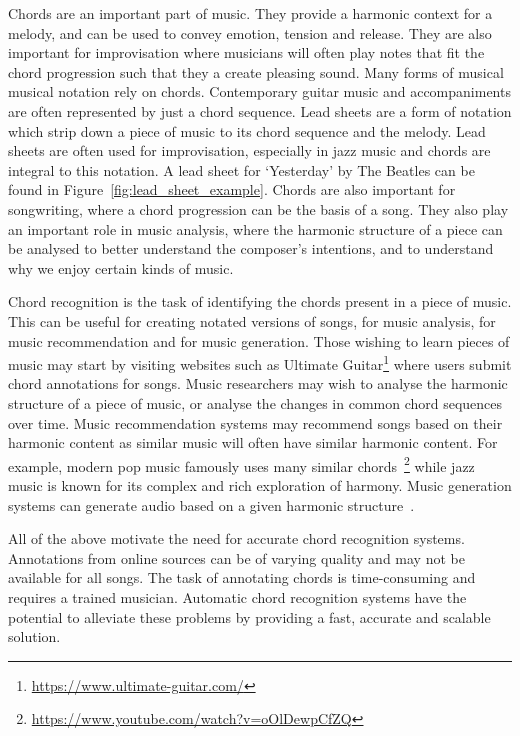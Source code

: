 Chords are an important part of music. They provide a harmonic context for a melody, and can be used to convey emotion, tension and release. They are also important for improvisation where musicians will often play notes that fit the chord progression such that they a create pleasing sound. Many forms of musical musical notation rely on chords. Contemporary guitar music and accompaniments are often represented by just a chord sequence. Lead sheets are a form of notation which strip down a piece of music to its chord sequence and the melody. Lead sheets are often used for improvisation, especially in jazz music and chords are integral to this notation. A lead sheet for `Yesterday' by The Beatles can be found in Figure~\ref{fig:lead_sheet_example}. Chords are also important for songwriting, where a chord progression can be the basis of a song. They also play an important role in music analysis, where the harmonic structure of a piece can be analysed to better understand the composer's intentions, and to understand why we enjoy certain kinds of music.

Chord recognition is the task of identifying the chords present in a piece of music. This can be useful for creating notated versions of songs, for music analysis, for music recommendation and for music generation. Those wishing to learn pieces of music may start by visiting websites such as Ultimate Guitar\footnote{\url{https://www.ultimate-guitar.com/}} where users submit chord annotations for songs. Music researchers may wish to analyse the harmonic structure of a piece of music, or analyse the changes in common chord sequences over time. Music recommendation systems may recommend songs based on their harmonic content as similar music will often have similar harmonic content. For example, modern pop music famously uses many similar chords~\footnote{\url{https://www.youtube.com/watch?v=oOlDewpCfZQ}} while jazz music is known for its complex and rich exploration of harmony. Music generation systems can generate audio based on a given harmonic structure~\citep{MusicGenChord}.

All of the above motivate the need for accurate chord recognition systems. Annotations from online sources can be of varying quality and may not be available for all songs. The task of annotating chords is time-consuming and requires a trained musician. Automatic chord recognition systems have the potential to alleviate these problems by providing a fast, accurate and scalable solution.

